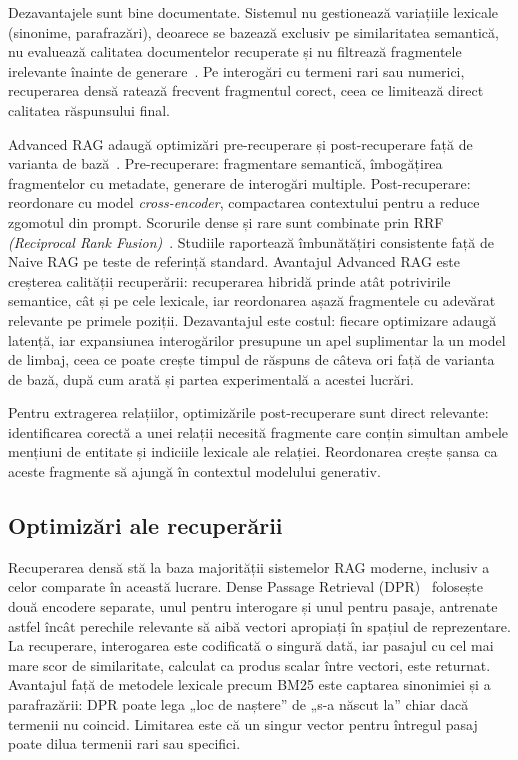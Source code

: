 Dezavantajele sunt bine documentate. Sistemul nu gestionează variațiile lexicale (sinonime, parafrazări), deoarece se bazează exclusiv pe similaritatea semantică, nu evaluează calitatea documentelor recuperate și nu filtrează fragmentele irelevante înainte de generare~\cite{gao2024retrievalaugmentedgenerationlargelanguage}. Pe interogări cu termeni rari sau numerici, recuperarea densă ratează frecvent fragmentul corect, ceea ce limitează direct calitatea răspunsului final.

Advanced RAG adaugă optimizări pre-recuperare și post-recuperare față de varianta de bază~\cite{gao2024retrievalaugmentedgenerationlargelanguage}. Pre-recuperare: fragmentare semantică, îmbogățirea fragmentelor cu metadate, generare de interogări multiple. Post-recuperare: reordonare cu model \textit{cross-encoder}, compactarea contextului pentru a reduce zgomotul din prompt. Scorurile dense și rare sunt combinate prin RRF \textit{(Reciprocal Rank Fusion)}~\cite{cormack2009rrf}. Studiile raportează îmbunătățiri consistente față de Naive RAG pe teste de referință standard. Avantajul Advanced RAG este creșterea calității recuperării: recuperarea hibridă prinde atât potrivirile semantice, cât și pe cele lexicale, iar reordonarea așază fragmentele cu adevărat relevante pe primele poziții. Dezavantajul este costul: fiecare optimizare adaugă latență, iar expansiunea interogărilor presupune un apel suplimentar la un model de limbaj, ceea ce poate crește timpul de răspuns de câteva ori față de varianta de bază, după cum arată și partea experimentală a acestei lucrări.

Pentru extragerea relațiilor, optimizările post-recuperare sunt direct relevante: identificarea corectă a unei relații necesită fragmente care conțin simultan ambele mențiuni de entitate și indiciile lexicale ale relației. Reordonarea crește șansa ca aceste fragmente să ajungă în contextul modelului generativ.

\subsection{Optimizări ale recuperării}

Recuperarea densă stă la baza majorității sistemelor RAG moderne, inclusiv a celor comparate în această lucrare. Dense Passage Retrieval (DPR)~\cite{karpukhin2020dpr} folosește două encodere separate, unul pentru interogare și unul pentru pasaje, antrenate astfel încât perechile relevante să aibă vectori apropiați în spațiul de reprezentare. La recuperare, interogarea este codificată o singură dată, iar pasajul cu cel mai mare scor de similaritate, calculat ca produs scalar între vectori, este returnat. Avantajul față de metodele lexicale precum BM25 este captarea sinonimiei și a parafrazării: DPR poate lega „loc de naștere” de „s-a născut la” chiar dacă termenii nu coincid. Limitarea este că un singur vector pentru întregul pasaj poate dilua termenii rari sau specifici.

